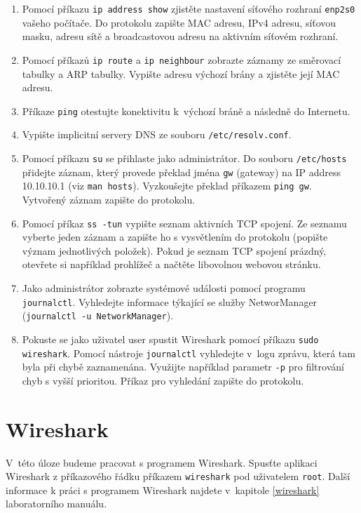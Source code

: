 \documentclass[a4paper,11pt]{article}
\begin{document}
\begin{enumerate}
  \item Pomocí příkazu {\tt ip address show} zjistěte nastavení síťového rozhraní {\tt enp2s0} vašeho počítače. Do protokolu zapište MAC adresu, IPv4 adresu, síťovou masku, adresu sítě a broadcastovou adresu na aktivním síťovém rozhraní.
  \item Pomocí příkazů {\tt ip route} a {\tt ip neighbour} zobrazte záznamy ze směrovací tabulky a ARP tabulky. Vypište adresu výchozí brány a zjistěte její MAC adresu. 
  \item Příkaze {\tt ping} otestujte konektivitu k~výchozí bráně a následně do Internetu. 
  \item Vypište implicitní servery DNS ze souboru {\tt /etc/resolv.conf}.
  \item Pomocí příkazu {\tt su} se přihlaste jako administrátor. Do souboru {\tt /etc/hosts} přidejte záznam, který provede překlad jména {\tt gw} (gateway) na IP address 10.10.10.1 (viz {\tt man hosts}). Vyzkoušejte překlad příkazem {\tt ping gw}. Vytvořený záznam zapište do protokolu. 
  \item Pomocí příkaz {\tt ss -tun} vypište seznam aktivních TCP spojení. Ze seznamu vyberte jeden záznam a zapište ho s vysvětlením do protokolu (popište význam jednotlivých položek). Pokud je seznam TCP spojení prázdný, otevřete si například prohlížeč a načtěte libovolnou webovou stránku. 
  \item Jako administrátor zobrazte systémové události pomocí programu \texttt{journalctl}. Vyhledejte informace týkající se služby NetworManager ({\tt journalctl -u NetworkManager}).  
  \item Pokuste se jako uživatel user spustit Wireshark pomocí příkazu \texttt{sudo wireshark}. Pomocí nástroje {\tt journalctl} vyhledejte v~logu zprávu, která tam byla při chybě zaznamenána. Využijte například parametr {\tt -p} pro filtrování chyb s vyšší prioritou. Příkaz pro vyhledání zapište do protokolu. 
\end{enumerate}

\section{Wireshark}
V~této úloze budeme pracovat s programem Wireshark. Spusťte aplikaci Wireshark z příkazového řádku příkazem \texttt{wireshark}
pod uživatelem \texttt{root}. Další informace k práci s programem Wireshark najdete v~kapitole \ref{wireshark} laboratorního manuálu. 
\end{document}
